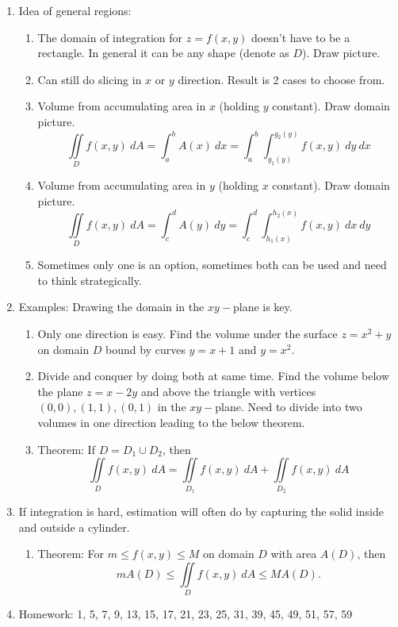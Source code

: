 \documentclass{article}
\begin{document}
\begin{enumerate}

\item Idea of general regions:
\begin{enumerate}
\item The domain of integration for $z=f(x,y)$ doesn't have to be a rectangle. In general it can be any shape (denote as $D$). Draw picture.
\item Can still do slicing in $x$ or $y$ direction. Result is 2 cases to choose from. 
\item Volume from accumulating area in $x$ (holding $y$ constant). Draw domain picture.
\[
\iint\limits_D f(x,y) ~dA = \int_a^b A(x) ~dx = \int_a^b \int_{g_1(y)}^{g_2(y)} f(x,y) ~dy ~dx
\]
\item Volume from accumulating area in $y$ (holding $x$ constant). Draw domain picture.
\[
\iint\limits_D f(x,y) ~dA = \int_c^d A(y) ~dy = \int_c^d \int_{h_1(x)}^{h_2(x)} f(x,y) ~dx ~dy
\]
\item Sometimes only one is an option, sometimes both can be used and need to think strategically.
\end{enumerate}

\item Examples: Drawing the domain in the $xy-$plane is key.
\begin{enumerate}
\item Only one direction is easy. Find the volume under the surface $z=x^2+y$ on domain $D$ bound by curves $y=x+1$ and $y=x^2$.
\item Divide and conquer by doing both at same time. Find the volume below the plane $z=x-2y$ and above the triangle with vertices $(0,0), (1,1), (0,1)$ in the $xy-$plane. Need to divide into two volumes in one direction leading to the below theorem.
\item Theorem: If $D = D_1 \cup D_2$, then
\[
\iint\limits_D f(x,y) ~dA = \iint\limits_{D_1} f(x,y) ~dA + \iint\limits_{D_2} f(x,y) ~dA 
\]
\end{enumerate}

\item If integration is hard, estimation will often do by capturing the solid inside and outside a cylinder.
\begin{enumerate}
\item Theorem: For $m \leq f(x,y) \leq M$ on domain $D$ with area $A(D)$, then
\[
m A(D) \leq \iint\limits_{D} f(x,y) ~dA \leq M A(D).
\]
\end{enumerate}

\item Homework: 1, 5, 7, 9, 13, 15, 17, 21, 23, 25, 31, 39, 45, 49, 51, 57, 59

\end{enumerate}
\end{document}

